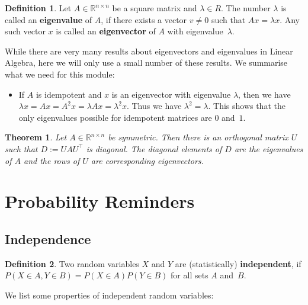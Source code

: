 \documentclass[
  a4paper,
]{article}
\providecommand{\tightlist}{%
  \setlength{\itemsep}{0pt}\setlength{\parskip}{0pt}}
\newtheorem{theorem}{Theorem}[section]
\theoremstyle{definition}
\newtheorem{definition}{Definition}[section]
\theoremstyle{definition}
\theoremstyle{definition}
\theoremstyle{definition}
\theoremstyle{remark}
\begin{document}
\begin{definition}
Let \(A \in\mathbb{R}^{n\times n}\) be a square matrix and \(\lambda\in R\).
The number \(\lambda\) is called an \textbf{eigenvalue} of \(A\), if there
exists a vector \(v \neq 0\) such that \(A x = \lambda x\). Any
such vector \(x\) is called an \textbf{eigenvector} of \(A\) with eigenvalue~\(\lambda\).
\end{definition}

While there are very many results about eigenvectors and eigenvalues
in Linear Algebra, here we will only use a small number of these results.
We summarise what we need for this module:

\begin{itemize}
\tightlist
\item
  If \(A\) is idempotent and \(x\) is an eigenvector with eigenvalue \(\lambda\),
  then we have \(\lambda x = A x = A^2 x = \lambda Ax = \lambda^2 x\). Thus we
  have \(\lambda^2 = \lambda\). This shows that the only eigenvalues possible
  for idempotent matrices are \(0\) and~\(1\).
\end{itemize}

\begin{theorem}
\protect\hypertarget{thm:spectral}{}\label{thm:spectral}Let \(A\in\mathbb{R}^{n\times n}\) be symmetric. Then there is an orthogonal
matrix \(U\) such that \(D := U A U^\top\) is diagonal. The diagonal
elements of \(D\) are the eigenvalues of \(A\) and the rows of \(U\)
are corresponding eigenvectors.
\end{theorem}

\clearpage

\section{Probability Reminders}\label{Sx2-probability}

\subsection{Independence}\label{independence}

\begin{definition}
Two random variables \(X\) and \(Y\) are (statistically) \textbf{independent}, if
\(P(X\in A, Y\in B) = P(X\in A) P(Y\in B)\) for all sets \(A\) and~\(B\).
\end{definition}

We list some properties of independent random variables:
\end{document}

